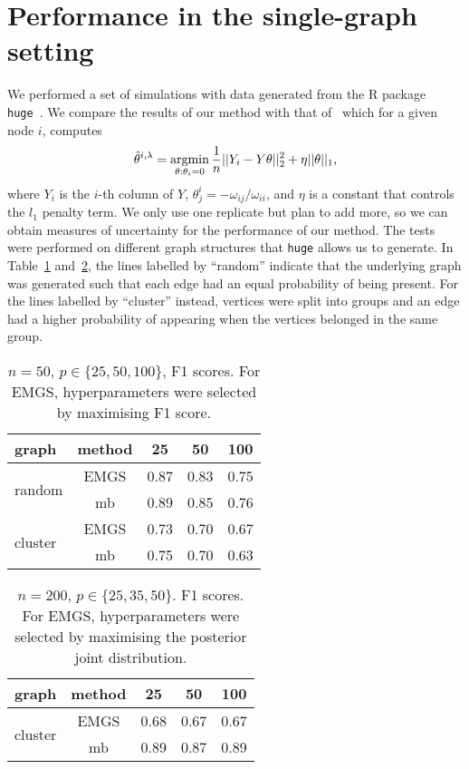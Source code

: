 \documentclass[a4paper, 11pt, oneside]{report}
\DeclareMathOperator{\argmin}{argmin}
\newcommand{\1}{\mathds{1}}
\begin{document}
\section{Performance in the single-graph setting}
We performed a set of simulations with data generated from the R package
\texttt{huge}~\citep{huge2020}. We compare the results of our method with that of~\citet{mein2006} which for a given node $i$, computes
\[\hat{\theta}^{i, \lambda} = \argmin\displaylimits_{\theta : \theta_i = 0}\frac{1}{n} ||Y_i - Y \theta||_2^2 + \eta ||\theta||_1,\]
where $Y_i$ is the $i$-th column of $Y$, $\theta_j^i = -\omega_{ij}/\omega_{ii}$, and $\eta$ is a constant that controls the $l_1$ penalty term.
We only use one replicate but plan to add more, so we can obtain measures of uncertainty for the performance of our method.
The tests were performed on different graph structures that \texttt{huge} allows us to generate.
In Table~\ref{tab:cheat} and~\ref{tab:honest}, the lines labelled by ``random'' indicate that the
underlying graph was generated such that each edge had an equal probability of being present. For the lines labelled by ``cluster'' instead, vertices were split
into groups and an edge had a higher probability of appearing when the vertices
belonged in the same group.
\begin{table}[ht]
	\centering
	\small
	\begin{tabular}{lcccc}
		\toprule
		graph                    & method & 25   & 50   & 100  \\
		\midrule
		\multirow{2}{*}{random}  & EMGS   & 0.87 & 0.83 & 0.75 \\
		                         & mb     & 0.89 & 0.85 & 0.76 \\
		\midrule
		\multirow{2}{*}{cluster} & EMGS   & 0.73 & 0.70 & 0.67 \\
		                         & mb     & 0.75 & 0.70 & 0.63 \\
		\bottomrule
	\end{tabular}
	\caption{$n=50$, $p \in \{25, 50, 100\}$, F1 scores. For EMGS, hyperparameters were selected by maximising F1 score.}\label{tab:cheat}
\end{table}
\begin{table}
	\centering
	\small
	\begin{tabular}{lcccc}
		\toprule
		graph                    & method & 25   & 50   & 100  \\
		\midrule
		\multirow{2}{*}{cluster} & EMGS   & 0.68 & 0.67 & 0.67 \\
		                         & mb     & 0.89 & 0.87 & 0.89 \\
		\bottomrule
	\end{tabular}
	\caption{$n=200$, $p \in \{25, 35, 50\}$. F1 scores. For EMGS, hyperparameters were selected by maximising the posterior joint distribution.}\label{tab:honest}
\end{table}
\end{document}

